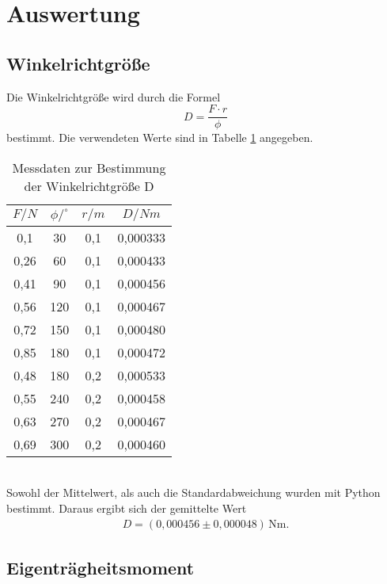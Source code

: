 \section{Auswertung}
\label{sec:Auswertung}
\subsection{Winkelrichtgröße}
Die Winkelrichtgröße wird durch die Formel
\begin{equation}
  D = \frac{F \cdot r}{\phi}
\end{equation}
bestimmt. Die verwendeten Werte sind in Tabelle \ref{tab:winkelrichtgr} angegeben.
\begin{table}
  \centering
  \caption{Messdaten zur Bestimmung der Winkelrichtgröße D}
  \label{tab:winkelrichtgr}
  \begin{tabular}{c c c c}
    \toprule
    $F/N$ & $\phi /^{\circ}$ & $r/m$ & $D/Nm$ \\
    \midrule
    0,1  &  30 & 0,1 & 0,000333 \\
    0,26 &  60 & 0,1 & 0,000433 \\
    0,41 &  90 & 0,1 & 0,000456 \\
    0,56 & 120 & 0,1 & 0,000467 \\
    0,72 & 150 & 0,1 & 0,000480 \\
    0,85 & 180 & 0,1 & 0,000472 \\
    0,48 & 180 & 0,2 & 0,000533 \\
    0,55 & 240 & 0,2 & 0,000458 \\
    0,63 & 270 & 0,2 & 0,000467 \\
    0,69 & 300 & 0,2 & 0,000460 \\
    \bottomrule
  \end{tabular}
\end{table}
\\Sowohl der Mittelwert, als auch die Standardabweichung wurden mit Python bestimmt. Daraus ergibt sich der
gemittelte Wert
\begin{align*}
    D = (0{,}000456 \pm 0{,}000048)\,\mathrm{Nm} .
\end{align*}

\subsection{Eigenträgheitsmoment}

